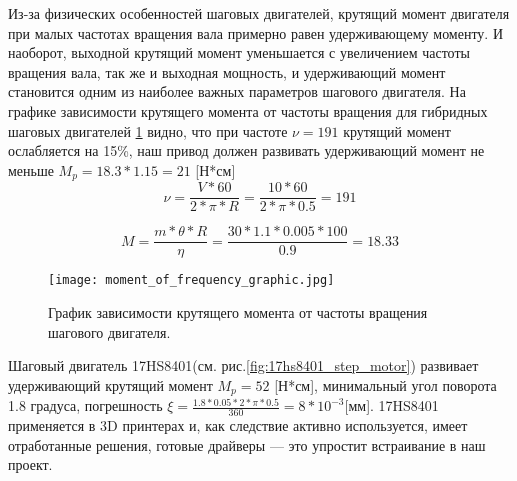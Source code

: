 Из-за физических особенностей шаговых двигателей, крутящий момент двигателя при малых частотах вращения вала примерно равен удерживающему моменту. И наоборот, выходной крутящий момент уменьшается с увеличением частоты вращения вала, так же и выходная мощность, и удерживающий момент становится одним из наиболее важных параметров шагового двигателя. На графике зависимости крутящего момента от частоты вращения для гибридных шаговых двигателей \ref{fig:MomentFrequency} видно, что при частоте $\nu=191$ крутящий момент ослабляется на 15\%, наш привод должен развивать удерживающий момент не меньше $M_{p}=18.3*1.15=21$ [Н*см]
\begin{equation}
\label{eq:frec}
\nu =\frac{V*60}{2*\pi*R}= \frac{10*60}{2*\pi*0.5}=191
\end{equation}

\begin{equation}
\label{eq:moment}
M=\frac{m*\theta*R}{\eta}= \frac{30*1.1*0.005*100}{0.9}=18.33
\end{equation}

\begin{figure}[ht]
	\centering
     \texttt{[image: moment\_of\_frequency\_graphic.jpg]}
	\caption{График зависимости крутящего момента от частоты вращения шагового двигателя.}
	\label{fig:MomentFrequency}
\end{figure}

Шаговый двигатель 17HS8401(см. рис.\ref{fig:17hs8401_step_motor}) развивает удерживающий крутящий момент $M_{p}=52$ [Н*см], минимальный угол поворота 1.8 градуса, погрешность $\xi=\frac{1.8*0.05*2*\pi*0.5}{360}=8*10^{-3} $[мм]. 17HS8401 применяется в 3D принтерах и, как следствие активно используется, имеет отработанные решения, готовые драйверы --- это упростит встраивание в наш проект.

